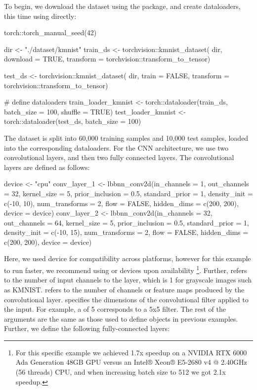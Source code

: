 To begin, we download the dataset using the  package, and create dataloaders, this time using  directly:
\begin{example}
torch::torch_manual_seed(42)

dir <- "./dataset/kmnist"
train_ds <- torchvision::kmnist_dataset(
   dir,
   download = TRUE,
   transform = torchvision::transform_to_tensor)

test_ds <- torchvision::kmnist_dataset(
  dir,
  train = FALSE,
  transform = torchvision::transform_to_tensor)

# define dataloaders 
train_loader_kmnist <- torch::dataloader(train_ds, batch_size = 100, shuffle = TRUE)
test_loader_kmnist <- torch::dataloader(test_ds, batch_size = 100)
\end{example}
The dataset is split into 60,000 training samples and 10,000 test samples, loaded into the corresponding dataloaders. For the CNN architecture, we use two convolutional layers, and then two fully connected layers. The convolutional layers are defined as follows:
\begin{example}
device <- "cpu"
conv_layer_1 <- lbbnn_conv2d(in_channels = 1, out_channels = 32, kernel_size = 5,
                             prior_inclusion = 0.5, standard_prior = 1,
                             density_init = c(-10, 10), num_transforms = 2,
                             flow = FALSE, hidden_dims = c(200, 200),
                             device = device)
conv_layer_2 <- lbbnn_conv2d(in_channels = 32, out_channels = 64, kernel_size = 5,
                             prior_inclusion = 0.5, standard_prior = 1,
                             density_init = c(-10, 15), num_transforms = 2,
                             flow = FALSE, hidden_dims = c(200, 200),
                             device = device)
\end{example}
Here, we used  device for compatibility across platforms, however for this example to run faster, we recommend using  or  devices upon availability \footnote{For this specific example we achieved 1.7x speedup on a NVIDIA RTX 6000 Ada Generation 48GB GPU versus an Intel® Xeon® E5-2680 v4 @ 2.40GHz (56 threads) CPU, and when increasing batch size to 512 we got 2.1x speedup.}. Further,  refers to the number of input channels to the layer, which is 1 for grayscale images such as KMNIST.  refers to the number of channels or feature maps produced by the convolutional layer.  specifies the dimensions of the convolutional filter applied to the input. For example, a  of 5 corresponds to a 5x5 filter. The rest of the arguments are the same as those used to define  objects in previous examples. Further, we define the following fully-connected layers:
